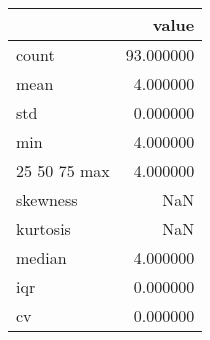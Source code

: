 \begin{tabular}{lr}
\toprule
 & value \\
\midrule
count & 93.000000 \\
mean & 4.000000 \\
std & 0.000000 \\
min & 4.000000 \\
25%
50%
75%
max & 4.000000 \\
skewness & NaN \\
kurtosis & NaN \\
median & 4.000000 \\
iqr & 0.000000 \\
cv & 0.000000 \\
\bottomrule
\end{tabular}
